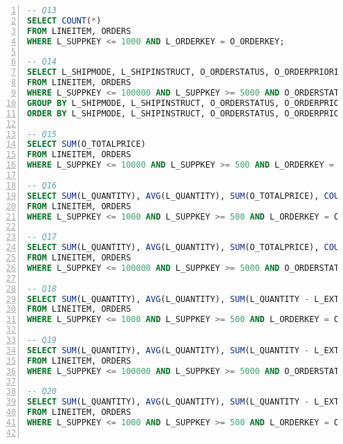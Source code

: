 \begin{lstlisting}[language=sql,numbers=left,xleftmargin=2em,multicols=2,basicstyle=\ttfamily\tiny]
-- Q13
SELECT COUNT(*)
FROM LINEITEM, ORDERS
WHERE L_SUPPKEY <= 1000 AND L_ORDERKEY = O_ORDERKEY;

-- Q14
SELECT L_SHIPMODE, L_SHIPINSTRUCT, O_ORDERSTATUS, O_ORDERPRIORITY, SUM(L_QUANTITY), AVG(L_QUANTITY), SUM(L_QUANTITY - L_EXTENDEDPRICE), SUM(L_QUANTITY * L_EXTENDEDPRICE - 1), AVG(L_DISCOUNT * (L_TAX +1)), AVG(L_QUANTITY / (L_TAX +1)), SUM(L_TAX)/SUM(L_EXTENDEDPRICE), SUM(L_QUANTITY * 0.5), AVG(L_QUANTITY * 0.2), SUM(O_TOTALPRICE), AVG(O_SHIPPRIORITY), SUM(O_TOTALPRICE - L_EXTENDEDPRICE), AVG(O_SHIPPRIORITY * L_EXTENDEDPRICE - 1), SUM(O_SHIPPRIORITY)/SUM(O_TOTALPRICE), COUNT(*)
FROM LINEITEM, ORDERS
WHERE L_SUPPKEY <= 100000 AND L_SUPPKEY >= 5000 AND O_ORDERSTATUS = 'P' AND L_ORDERKEY = O_ORDERKEY
GROUP BY L_SHIPMODE, L_SHIPINSTRUCT, O_ORDERSTATUS, O_ORDERPRIORITY
ORDER BY L_SHIPMODE, L_SHIPINSTRUCT, O_ORDERSTATUS, O_ORDERPRIORITY;

-- Q15
SELECT SUM(O_TOTALPRICE)
FROM LINEITEM, ORDERS
WHERE L_SUPPKEY <= 10000 AND L_SUPPKEY >= 500 AND L_ORDERKEY = O_ORDERKEY;

-- Q16
SELECT SUM(L_QUANTITY), AVG(L_QUANTITY), SUM(O_TOTALPRICE), COUNT(*)
FROM LINEITEM, ORDERS
WHERE L_SUPPKEY <= 1000 AND L_SUPPKEY >= 500 AND L_ORDERKEY = O_ORDERKEY;

-- Q17
SELECT SUM(L_QUANTITY), AVG(L_QUANTITY), SUM(O_TOTALPRICE), COUNT(*)
FROM LINEITEM, ORDERS
WHERE L_SUPPKEY <= 100000 AND L_SUPPKEY >= 5000 AND O_ORDERSTATUS = 'F' AND L_ORDERKEY = O_ORDERKEY;

-- Q18
SELECT SUM(L_QUANTITY), AVG(L_QUANTITY), SUM(L_QUANTITY - L_EXTENDEDPRICE), SUM(L_QUANTITY * L_EXTENDEDPRICE - 1), SUM(O_TOTALPRICE), AVG(O_SHIPPRIORITY), COUNT(*)
FROM LINEITEM, ORDERS
WHERE L_SUPPKEY <= 1000 AND L_SUPPKEY >= 500 AND L_ORDERKEY = O_ORDERKEY;

-- Q19
SELECT SUM(L_QUANTITY), AVG(L_QUANTITY), SUM(L_QUANTITY - L_EXTENDEDPRICE), SUM(L_QUANTITY * L_EXTENDEDPRICE - 1), SUM(O_TOTALPRICE), AVG(O_SHIPPRIORITY), COUNT(*)
FROM LINEITEM, ORDERS
WHERE L_SUPPKEY <= 100000 AND L_SUPPKEY >= 5000 AND O_ORDERSTATUS = 'F' AND L_ORDERKEY = O_ORDERKEY;

-- Q20
SELECT SUM(L_QUANTITY), AVG(L_QUANTITY), SUM(L_QUANTITY - L_EXTENDEDPRICE), SUM(L_QUANTITY * L_EXTENDEDPRICE - 1), AVG(L_DISCOUNT * (L_TAX +1)), AVG(L_QUANTITY / (L_TAX +1)), SUM(O_TOTALPRICE), AVG(O_SHIPPRIORITY), SUM(O_TOTALPRICE - L_EXTENDEDPRICE), AVG(O_SHIPPRIORITY * L_EXTENDEDPRICE - 1), COUNT(*)
FROM LINEITEM, ORDERS
WHERE L_SUPPKEY <= 1000 AND L_SUPPKEY >= 500 AND L_ORDERKEY = O_ORDERKEY;


\end{lstlisting}
